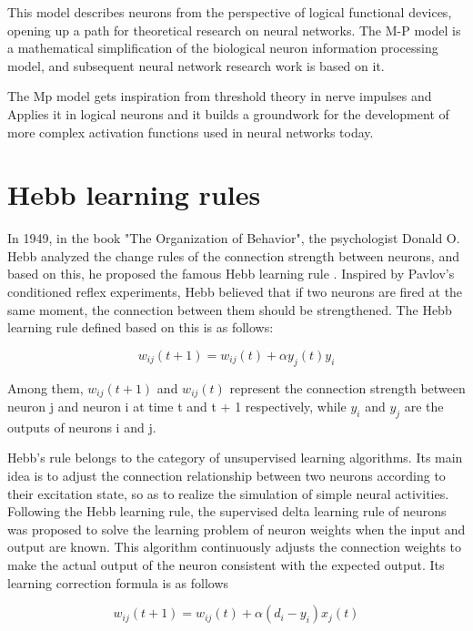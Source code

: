 \documentclass[12pt,a4paper]{report}
\begin{document}
This model describes neurons from the perspective of logical functional devices, opening up a path for theoretical research on neural networks. The M-P model is a mathematical simplification of the biological neuron information processing model, and subsequent neural network research work is based on it. 

The Mp model gets inspiration from threshold theory in nerve impulses and Applies it in logical neurons and it builds a groundwork for the development of more complex activation functions used in neural networks today.



\section{Hebb learning rules}
In 1949, in the book "The Organization of Behavior", the psychologist Donald O. Hebb analyzed the change rules of the connection strength between neurons, and based on this, he proposed the famous Hebb learning rule \cite{Hebb2002OrganizationBehaviorNeuropsychological}. Inspired by Pavlov's conditioned reflex experiments, Hebb believed that if two neurons are fired at the same moment, the connection between them should be strengthened. The Hebb learning rule defined based on this is as follows:

\begin{equation}
    w_{ij}(t + 1) = w_{ij}(t) + \alpha y_j(t)y_i
\end{equation}

Among them, $w_{ij}(t+1)$ and $w_{ij}(t)$ represent the connection strength between neuron j and neuron i at time t and t + 1 respectively, while $y_i$ and $y_j$ are the outputs of neurons i and j.


Hebb's rule belongs to the category of unsupervised learning algorithms. Its main idea is to adjust the connection relationship between two neurons according to their excitation state, so as to realize the simulation of simple neural activities. Following the Hebb learning rule, the supervised delta learning rule of neurons was proposed to solve the learning problem of neuron weights when the input and output are known. This algorithm continuously adjusts the connection weights to make the actual output of the neuron consistent with the expected output. Its learning correction formula is as follows


\begin{equation}
    w_{ij}(t + 1) = w_{ij}(t) + \alpha(d_i - y_i)x_j(t)
\end{equation}
\end{document}
